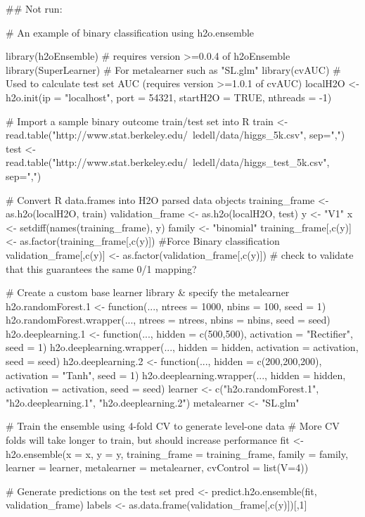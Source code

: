 \documentclass[a4paper]{book}
\begin{document}
\begin{Examples}
\begin{ExampleCode}
## Not run: 
    
# An example of binary classification using h2o.ensemble

library(h2oEnsemble)  # requires version >=0.0.4 of h2oEnsemble
library(SuperLearner)  # For metalearner such as "SL.glm"
library(cvAUC)  # Used to calculate test set AUC (requires version >=1.0.1 of cvAUC)
localH2O <-  h2o.init(ip = "localhost", port = 54321, startH2O = TRUE, nthreads = -1)


# Import a sample binary outcome train/test set into R
train <- read.table("http://www.stat.berkeley.edu/~ledell/data/higgs_5k.csv", sep=",")
test <- read.table("http://www.stat.berkeley.edu/~ledell/data/higgs_test_5k.csv", sep=",")


# Convert R data.frames into H2O parsed data objects
training_frame <- as.h2o(localH2O, train)
validation_frame <- as.h2o(localH2O, test)
y <- "V1"
x <- setdiff(names(training_frame), y)
family <- "binomial"
training_frame[,c(y)] <- as.factor(training_frame[,c(y)])  #Force Binary classification
validation_frame[,c(y)] <- as.factor(validation_frame[,c(y)])  # check to validate that this guarantees the same 0/1 mapping?



# Create a custom base learner library & specify the metalearner
h2o.randomForest.1 <- function(..., ntrees = 1000, nbins = 100, seed = 1) h2o.randomForest.wrapper(..., ntrees = ntrees, nbins = nbins, seed = seed)
h2o.deeplearning.1 <- function(..., hidden = c(500,500), activation = "Rectifier", seed = 1)  h2o.deeplearning.wrapper(..., hidden = hidden, activation = activation, seed = seed)
h2o.deeplearning.2 <- function(..., hidden = c(200,200,200), activation = "Tanh", seed = 1)  h2o.deeplearning.wrapper(..., hidden = hidden, activation = activation, seed = seed)
learner <- c("h2o.randomForest.1", "h2o.deeplearning.1", "h2o.deeplearning.2")
metalearner <- "SL.glm"



# Train the ensemble using 4-fold CV to generate level-one data
# More CV folds will take longer to train, but should increase performance
fit <- h2o.ensemble(x = x, y = y, training_frame = training_frame, 
                    family = family, 
                    learner = learner, metalearner = metalearner,
                    cvControl = list(V=4))


# Generate predictions on the test set
pred <- predict.h2o.ensemble(fit, validation_frame)
labels <- as.data.frame(validation_frame[,c(y)])[,1]



\end{ExampleCode}
\end{Examples}
\end{document}
